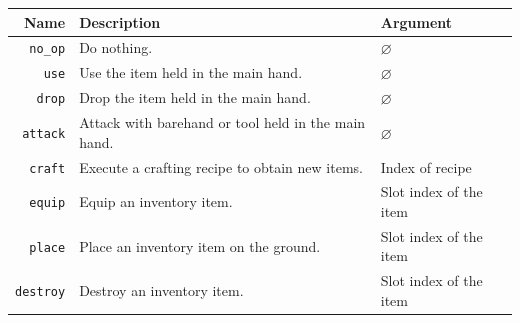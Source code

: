 
\begin{center}
    
\begin{tabular}{@{}r|l|l@{}}
\toprule
\textbf{Name} & \textbf{Description}     & \textbf{Argument}                 \\ \midrule
\texttt{no\_op}         & Do nothing.    & $\varnothing$                      \\
\texttt{use}           & Use the item held in the main hand.  &   $\varnothing$                \\
\texttt{drop}          & Drop the item held in the main hand.                & $\varnothing$                      \\
\texttt{attack}        & Attack with barehand or tool held in the main hand. & $\varnothing$                      \\
\texttt{craft}         & Execute a crafting recipe to obtain new items.      & Index of recipe    \\
\texttt{equip}         & Equip an inventory item.                            & Slot index of the item \\
\texttt{place}         & Place an inventory item on the ground.              & Slot index of the item \\
\texttt{destroy}       & Destroy an inventory item.                          & Slot index of the item \\ \bottomrule
\end{tabular}
\end{center}

